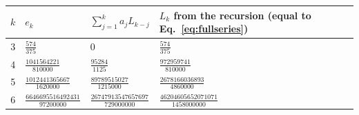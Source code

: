 \begin{tabular}{clll}\toprule
$k$ & $e_k$ & $\sum_{j=1}^{k}a_jL_{k-j}$ & $L_k$ from the recursion (equal to Eq.~\eqref{eq:fullseries}) \\\midrule
3 & $\frac{574}{375}$ & $0$ & $\frac{574}{375}$ \\
4 & $\frac{1041564221}{810000}$ & $\frac{95284}{1125}$ & $\frac{972959741}{810000}$ \\
5 & $\frac{1012441365667}{1620000}$ & $\frac{89789515027}{1215000}$ & $\frac{2678166036893}{4860000}$ \\
6 & $\frac{6646695516492431}{97200000}$ & $\frac{26747913547657697}{729000000}$ & $\frac{46204605652071071}{1458000000}$ \\
\bottomrule\end{tabular}
